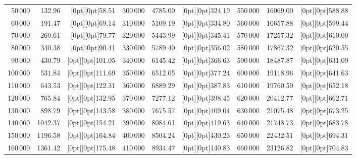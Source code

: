 {{\begin{tabular}{|r|r|r||r|r|r||r|r|r|}
50\,000 & 132.96 & \raisebox{-6.7pt}[0pt][0pt]{58.51} & 300\,000 & 4785.00 & \raisebox{-6.7pt}[0pt][0pt]{324.19} & 550\,000 & 16069.00 & \raisebox{-6.7pt}[0pt][0pt]{588.88} \\
\cline{1-2}\cline{4-5}\cline{7-8}
60\,000 & 191.47 & \raisebox{-6.7pt}[0pt][0pt]{69.14} & 310\,000 & 5109.19 & \raisebox{-6.7pt}[0pt][0pt]{334.80} & 560\,000 & 16657.88 & \raisebox{-6.7pt}[0pt][0pt]{599.44} \\
70\,000 & 260.61 & \raisebox{-6.7pt}[0pt][0pt]{79.77} & 320\,000 & 5443.99 & \raisebox{-6.7pt}[0pt][0pt]{345.41} & 570\,000 & 17257.32 & \raisebox{-6.7pt}[0pt][0pt]{610.00} \\
80\,000 & 340.38 & \raisebox{-6.7pt}[0pt][0pt]{90.41} & 330\,000 & 5789.40 & \raisebox{-6.7pt}[0pt][0pt]{356.02} & 580\,000 & 17867.32 & \raisebox{-6.7pt}[0pt][0pt]{620.55} \\
90\,000 & 430.79 & \raisebox{-6.7pt}[0pt][0pt]{101.05} & 340\,000 & 6145.42 & \raisebox{-6.7pt}[0pt][0pt]{366.63} & 590\,000 & 18487.87 & \raisebox{-6.7pt}[0pt][0pt]{631.09} \\
100\,000 & 531.84 & \raisebox{-6.7pt}[0pt][0pt]{111.69} & 350\,000 & 6512.05 & \raisebox{-6.7pt}[0pt][0pt]{377.24} & 600\,000 & 19118.96 & \raisebox{-6.7pt}[0pt][0pt]{641.63} \\
\cline{1-2}\cline{4-5}\cline{7-8}
110\,000 & 643.53 & \raisebox{-6.7pt}[0pt][0pt]{122.31} & 360\,000 & 6889.29 & \raisebox{-6.7pt}[0pt][0pt]{387.83} & 610\,000 & 19760.59 & \raisebox{-6.7pt}[0pt][0pt]{652.18} \\
120\,000 & 765.84 & \raisebox{-6.7pt}[0pt][0pt]{132.95} & 370\,000 & 7277.12 & \raisebox{-6.7pt}[0pt][0pt]{398.45} & 620\,000 & 20412.77 & \raisebox{-6.7pt}[0pt][0pt]{662.71} \\
130\,000 & 898.79 & \raisebox{-6.7pt}[0pt][0pt]{143.58} & 380\,000 & 7675.57 & \raisebox{-6.7pt}[0pt][0pt]{409.04} & 630\,000 & 21075.48 & \raisebox{-6.7pt}[0pt][0pt]{673.25} \\
140\,000 & 1042.37 & \raisebox{-6.7pt}[0pt][0pt]{154.21} & 390\,000 & 8084.61 & \raisebox{-6.7pt}[0pt][0pt]{419.63} & 640\,000 & 21748.73 & \raisebox{-6.7pt}[0pt][0pt]{683.78} \\
150\,000 & 1196.58 & \raisebox{-6.7pt}[0pt][0pt]{164.84} & 400\,000 & 8504.24 & \raisebox{-6.7pt}[0pt][0pt]{430.23} & 650\,000 & 22432.51 & \raisebox{-6.7pt}[0pt][0pt]{694.31} \\
\cline{1-2}\cline{4-5}\cline{7-8}
160\,000 & 1361.42 & \raisebox{-6.7pt}[0pt][0pt]{175.48} & 410\,000 & 8934.47 & \raisebox{-6.7pt}[0pt][0pt]{440.83} & 660\,000 & 23126.82 & \raisebox{-6.7pt}[0pt][0pt]{704.83} \\

\end{tabular}}}
